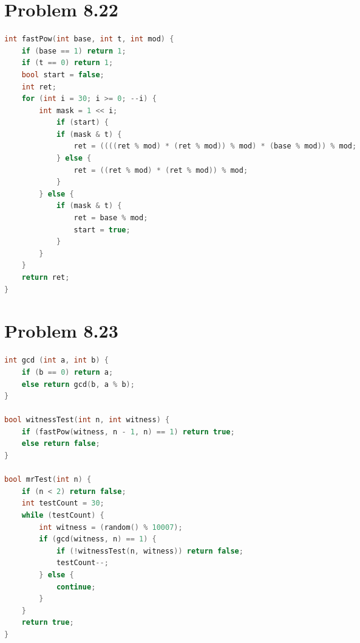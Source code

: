 \documentclass[acmlarge,screen]{acmart}
\begin{document}
\begin{CJK*}{UTF8}{gbsn}
\section{Problem 8.22}
\begin{lstlisting}[language=C++]
int fastPow(int base, int t, int mod) {
    if (base == 1) return 1;
    if (t == 0) return 1;
    bool start = false;
    int ret;
    for (int i = 30; i >= 0; --i) {
        int mask = 1 << i;
            if (start) {
            if (mask & t) {
                ret = ((((ret % mod) * (ret % mod)) % mod) * (base % mod)) % mod;
            } else {
                ret = ((ret % mod) * (ret % mod)) % mod;
            }
        } else {
            if (mask & t) {
                ret = base % mod;
                start = true;
            }
        }
    }
    return ret;
}
\end{lstlisting}
\section{Problem 8.23}
\begin{lstlisting}[language=C++]
int gcd (int a, int b) {
    if (b == 0) return a;
    else return gcd(b, a % b);
}

bool witnessTest(int n, int witness) {
    if (fastPow(witness, n - 1, n) == 1) return true;
    else return false;
}

bool mrTest(int n) {
    if (n < 2) return false;
    int testCount = 30;
    while (testCount) {
        int witness = (random() % 10007);
        if (gcd(witness, n) == 1) {
            if (!witnessTest(n, witness)) return false;
            testCount--;
        } else {
            continue;
        }
    }
    return true;
}
\end{lstlisting}
\end{CJK*}
\end{document}

